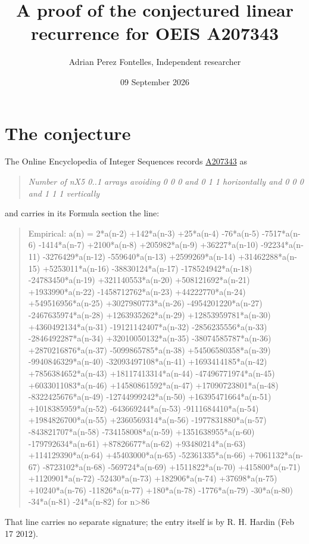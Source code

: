\documentclass[11pt]{article}
\title{A proof of the conjectured linear recurrence for OEIS A207343}
\author{Adrian Perez Fontelles, Independent researcher}
\date{09 September 2026}
\theoremstyle{definition}
\begin{document}
\maketitle
\section{The conjecture}

The Online Encyclopedia of Integer Sequences records \href{https://oeis.org/A207343}{A207343} as

\begin{quote}\itshape Number of nX5 0..1 arrays avoiding 0 0 0 and 0 1 1 horizontally and 0 0 0 and 1 1 1 vertically\end{quote}

and carries in its Formula section the line:

\begin{quote}\ttfamily Empirical: a(n) = 2*a(n-2) +142*a(n-3) +25*a(n-4) -76*a(n-5) -7517*a(n-6) -1414*a(n-7) +2100*a(n-8) +205982*a(n-9) +36227*a(n-10) -92234*a(n-11) -3276429*a(n-12) -559640*a(n-13) +2599269*a(n-14) +31462288*a(n-15) +5253011*a(n-16) -38830124*a(n-17) -178524942*a(n-18) -24783450*a(n-19) +321140553*a(n-20) +508121692*a(n-21) +1933990*a(n-22) -1458712762*a(n-23) +44222770*a(n-24) +549516956*a(n-25) +3027980773*a(n-26) -4954201220*a(n-27) -2467635974*a(n-28) +1263935262*a(n-29) +12853959781*a(n-30) +4360492134*a(n-31) -19121142407*a(n-32) -2856235556*a(n-33) -2846492287*a(n-34) +32010050132*a(n-35) -38074585787*a(n-36) +2870216876*a(n-37) -5099865785*a(n-38) +54506580358*a(n-39) -9940846329*a(n-40) -32093497108*a(n-41) +1693414185*a(n-42) +7856384652*a(n-43) +18117413314*a(n-44) -47496771974*a(n-45) +6033011083*a(n-46) +14580861592*a(n-47) +17090723801*a(n-48) -8322425676*a(n-49) -12744999242*a(n-50) +16395471664*a(n-51) +1018385959*a(n-52) -643669244*a(n-53) -9111684410*a(n-54) +1984826700*a(n-55) +2360569314*a(n-56) -1977831880*a(n-57) -843821707*a(n-58) -734158008*a(n-59) +1351638955*a(n-60) -179792634*a(n-61) +87826677*a(n-62) +93480214*a(n-63) +114129390*a(n-64) +45403000*a(n-65) -52361335*a(n-66) +7061132*a(n-67) -8723102*a(n-68) -569724*a(n-69) +1511822*a(n-70) +415800*a(n-71) +1120901*a(n-72) -52430*a(n-73) +182906*a(n-74) +37698*a(n-75) +10240*a(n-76) -11826*a(n-77) +180*a(n-78) -1776*a(n-79) -30*a(n-80) -34*a(n-81) -24*a(n-82) for n>86\end{quote}

That line carries no separate signature; the entry itself is by R. H. Hardin (Feb 17 2012).
\end{document}
